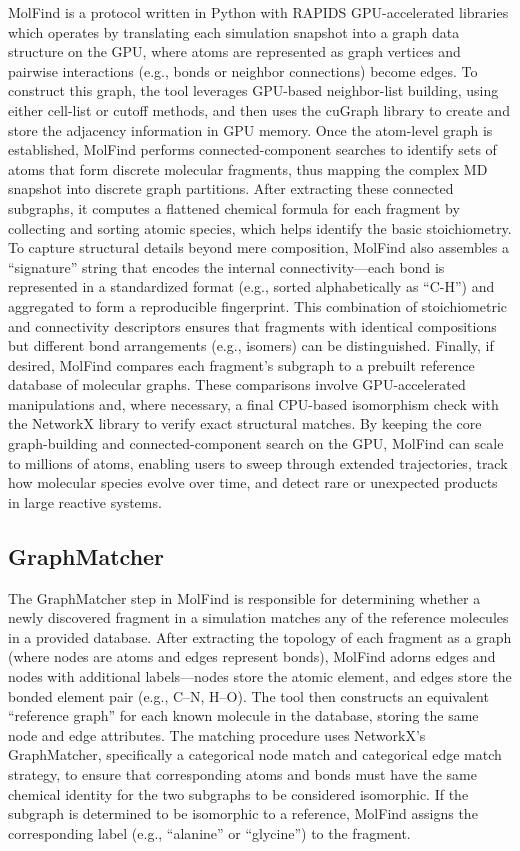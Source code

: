 MolFind is a protocol written in Python with RAPIDS 
GPU-accelerated libraries which operates by translating each simulation snapshot into a graph data structure on the GPU, where atoms are represented as graph vertices and pairwise interactions (e.g., bonds or neighbor connections) become edges. To construct this graph, the tool leverages GPU-based neighbor-list building, using either cell-list or cutoff methods, and then uses the cuGraph library to create and store the adjacency information in GPU memory. Once the atom-level graph is established, MolFind performs connected-component searches to identify sets of atoms that form discrete molecular fragments, thus mapping the complex MD snapshot into discrete graph partitions. After extracting these connected subgraphs, it computes a flattened chemical formula for each fragment by collecting and sorting atomic species, which helps identify the basic stoichiometry. To capture structural details beyond mere composition, MolFind also assembles a “signature” string that encodes the internal connectivity—each bond is represented in a standardized format (e.g., sorted alphabetically as “C-H”) and aggregated to form a reproducible fingerprint. This combination of stoichiometric and connectivity descriptors ensures that fragments with identical compositions but different bond arrangements (e.g., isomers) can be distinguished. Finally, if desired, MolFind compares each fragment’s subgraph to a prebuilt reference database of molecular graphs. These comparisons involve GPU-accelerated manipulations and, where necessary, a final CPU-based isomorphism check with the NetworkX library 
to verify exact structural matches. By keeping the core graph-building and connected-component search on the GPU, MolFind can scale to millions of atoms, enabling users to sweep through extended trajectories, track how molecular species evolve over time, and detect rare or unexpected products in large reactive systems.

\subsection{GraphMatcher}
\label{subsec:molfind_graphmatcher}

The GraphMatcher step in MolFind is responsible for determining whether a newly discovered fragment in a simulation matches any of the reference molecules in a provided database. After extracting the topology of each fragment as a graph (where nodes are atoms and edges represent bonds), MolFind adorns edges and nodes with additional labels—nodes store the atomic element, and edges store the bonded element pair (e.g., $\text{C–N}$, $\text{H–O}$). The tool then constructs an equivalent “reference graph” for each known molecule in the database, storing the same node and edge attributes. The matching procedure uses NetworkX’s GraphMatcher, specifically a categorical node match and categorical edge match strategy, to ensure that corresponding atoms and bonds must have the same chemical identity for the two subgraphs to be considered isomorphic. If the subgraph is determined to be isomorphic to a reference, MolFind assigns the corresponding label (e.g., “alanine” or “glycine”) to the fragment. 

